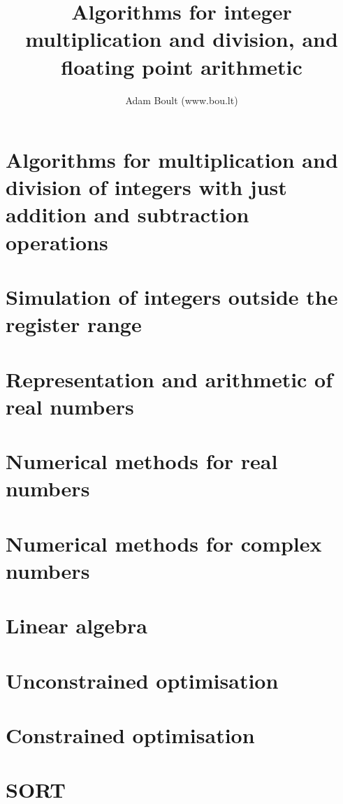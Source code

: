\documentclass[oneside]{book}
\begin{document}
\author{Adam Boult (www.bou.lt)}
\title{Algorithms for integer multiplication and division, and floating point arithmetic}
\maketitle

\setcounter{tocdepth}{0}
\tableofcontents



\part{Algorithms for multiplication and division of integers with just addition and subtraction operations}

\part{Simulation of integers outside the register range}

\part{Representation and arithmetic of real numbers}



\part{Numerical methods for real numbers}







\part{Numerical methods for complex numbers}


\part{Linear algebra}









\part{Unconstrained optimisation}





\part{Constrained optimisation}


\part{SORT}

\end{document}
